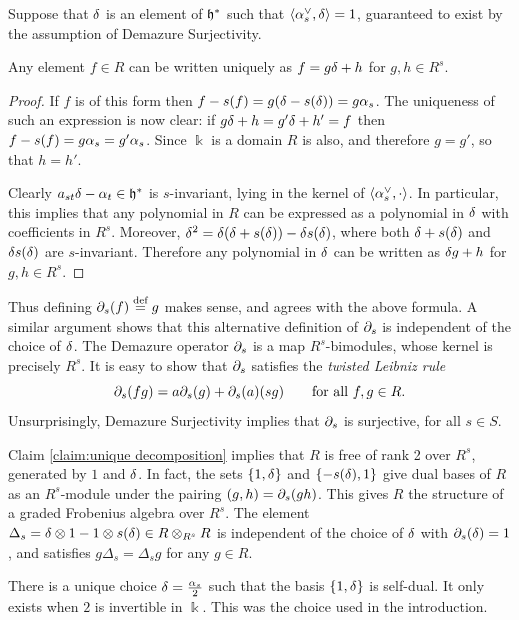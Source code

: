 Suppose that $\delta$ is an element of ${\mathfrak h}^*$ such that $\langle \alpha_s^\vee, \delta \rangle = 1$, guaranteed to exist by the assumption of Demazure Surjectivity. 

\begin{claim} Any element $f \in R$ can be written uniquely as $f = g\delta + h$ for $g,h \in R^s$. \label{claim:unique decomposition}\end{claim}
	
\begin{proof} If $f$ is of this form then $f - s(f) = g(\delta - s(\delta)) = g \alpha_s$. The uniqueness of such an expression is now clear: if $g
\delta + h = g' \delta + h' = f$ then $f-s(f) = g \alpha_s = g' \alpha_s$. Since $\Bbbk$ is a domain $R$ is also, and therefore $g=g'$, so that $h=h'$. 

Clearly $a_{st} \delta - \alpha_t \in {\mathfrak h}^*$ is $s$-invariant, lying in the kernel of $\langle \alpha_s^\vee, \cdot \rangle$. In particular, this implies that any polynomial in $R$ can
be expressed as a polynomial in $\delta$ with coefficients in $R^s$. Moreover, $\delta^2 = \delta(\delta + s(\delta)) - \delta s(\delta)$, where both $\delta + s(\delta)$ and $\delta s(\delta)$ are $s$-invariant. Therefore any
polynomial in $\delta$ can be written as $\delta g + h$ for $g,h \in R^s$. \end{proof}

Thus defining $\partial_s(f) \stackrel{\mbox{\scriptsize{def}}}{=} g$ makes sense, and agrees with the above formula. A similar argument shows that this alternative definition of $\partial_s$ is independent of
the choice of $\delta$. The Demazure operator $\partial_s$ is a map $R^s$-bimodules, whose kernel is precisely $R^s$. It is easy to show that $\partial_s$ satisfies the \emph{twisted Leibniz rule}
\[\partial_s(fg) = a\partial_s(g) + \partial_s(a)(sg) \qquad \text{for all $f, g \in R$.} \] Unsurprisingly, Demazure Surjectivity implies that $\partial_s$ is surjective, for all $s \in S$.

Claim \ref{claim:unique decomposition} implies that $R$ is free of rank 2 over $R^s$, generated by $1$ and $\delta$. In fact, the sets $\{1,\delta\}$ and $\{-s(\delta),1\}$ give dual bases of $R$ as
an $R^s$-module under the pairing $(g,h)=\partial_s(gh)$. This gives $R$ the structure of a graded Frobenius algebra over $R^s$. The element $\Delta_s = \delta \otimes 1 - 1 \otimes s(\delta) \in R \otimes_{R^s}
R$ is independent of the choice of $\delta$ with $\partial_s(\delta)=1$, and satisfies $g \Delta_s = \Delta_s g$ for any $g \in R$.

\begin{remark} There is a unique choice $\delta = \frac{\alpha_s}{2}$ such that the basis $\{1,\delta\}$ is self-dual. It only exists when $2$ is invertible in $\Bbbk$. This was the choice used in the introduction. \end{remark}

